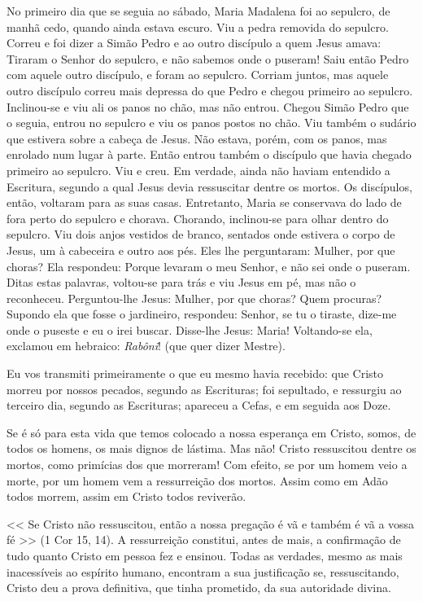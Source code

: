 \documentclass{rosario}
\begin{document}

No primeiro dia que se seguia ao sábado, Maria Madalena foi ao sepulcro, de manhã cedo, quando ainda estava escuro. Viu a pedra removida do sepulcro.
Correu e foi dizer a Simão Pedro e ao outro discípulo a quem Jesus amava:
Tiraram o Senhor do sepulcro, e não sabemos onde o puseram!
Saiu então Pedro com aquele outro discípulo, e foram ao sepulcro.
Corriam juntos, mas aquele outro discípulo correu mais depressa do que Pedro e chegou primeiro ao sepulcro.
Inclinou-se e viu ali os panos no chão, mas não entrou.
Chegou Simão Pedro que o seguia, entrou no sepulcro e viu os panos postos no chão.
Viu também o sudário que estivera sobre a cabeça de Jesus. Não estava, porém, com os panos, mas enrolado num lugar à parte.
Então entrou também o discípulo que havia chegado primeiro ao sepulcro. Viu e creu.
Em verdade, ainda não haviam entendido a Escritura, segundo a qual Jesus devia ressuscitar dentre os mortos.
Os discípulos, então, voltaram para as suas casas.
Entretanto, Maria se conservava do lado de fora perto do sepulcro e chorava. Chorando, inclinou-se para olhar dentro do sepulcro.
Viu dois anjos vestidos de branco, sentados onde estivera o corpo de Jesus, um à cabeceira e outro aos pés.
Eles lhe perguntaram: Mulher, por que choras?
Ela respondeu: Porque levaram o meu Senhor, e não sei onde o puseram.
Ditas estas palavras, voltou-se para trás e viu Jesus em pé, mas não o reconheceu.
Perguntou-lhe Jesus: Mulher, por que choras? Quem procuras? Supondo ela que fosse o jardineiro, respondeu: Senhor, se tu o tiraste, dize-me onde o puseste e eu o irei buscar.
Disse-lhe Jesus: Maria!
Voltando-se ela, exclamou em hebraico: \emph{Rabôni}! (que quer dizer Mestre).


Eu vos transmiti primeiramente o que eu mesmo havia recebido:
que Cristo morreu por nossos pecados, segundo as Escrituras;
foi sepultado, e ressurgiu ao terceiro dia, segundo as Escrituras;
apareceu a Cefas, e em seguida aos Doze.

Se é só para esta vida que temos colocado a nossa esperança em Cristo, somos, de todos os homens, os mais dignos de lástima.
Mas não! Cristo ressuscitou dentre os mortos, como primícias dos que morreram!
Com efeito, se por um homem veio a morte, por um homem vem a ressurreição dos mortos.
Assim como em Adão todos morrem, assim em Cristo todos reviverão.


<< Se Cristo não ressuscitou, então a nossa pregação é vã e também é vã a vossa fé >> (1 Cor 15, 14).
A ressurreição constitui, antes de mais, a confirmação de tudo quanto Cristo em pessoa fez e ensinou.
Todas as verdades, mesmo as mais inacessíveis ao espírito humano, encontram a sua justificação se, ressuscitando, Cristo deu a prova definitiva, que tinha prometido, da sua autoridade divina.
\end{document}
